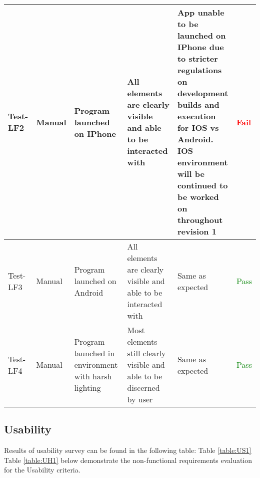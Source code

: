 \documentclass[12pt, titlepage]{article}
\begin{document}
\begin{table}[H]
{\begin{tabular}{|l|p{0.15\linewidth}|p{0.3\linewidth}|p{0.3\linewidth}|p{0.3\linewidth}|p{0.1\linewidth}|}
\hline
Test-LF2 & Manual & Program launched on IPhone & All elements are clearly visible and able to be interacted with & App unable to be launched on IPhone due to stricter regulations on development builds and execution for IOS vs Android. IOS environment will be continued to be worked on throughout revision 1 & \textcolor{Red}{Fail} \\
\hline
Test-LF3 & Manual & Program launched on Android & All elements are clearly visible and able to be interacted with & Same as expected & \textcolor{Green}{Pass} \\
\hline
Test-LF4 & Manual & Program launched in environment with harsh lighting & Most elements still clearly visible and able to be discerned by user & Same as expected & \textcolor{Green}{Pass} \\
\hline
\end{tabular}}
\label{table:LF1}
\end{table}

\restoregeometry

\subsection{Usability}

Results of usability survey can be found in the following table: Table \ref{table:US1}\\

Table \ref{table:UH1} below demonstrate the non-functional requirements evaluation for the Usability criteria.
\end{document}
